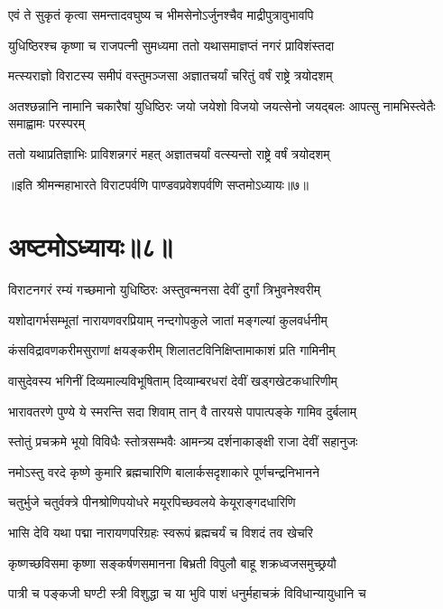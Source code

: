 \twolineshloka
{एवं ते सुकृतं कृत्वा समन्तादवघुष्य च}
{भीमसेनोऽर्जुनश्चैव माद्रीपुत्रावुभावपि}


\twolineshloka
{युधिष्ठिरश्च कृष्णा च राजपत्नी सुमध्यमा}
{ततो यथासमाज्ञप्तं नगरं प्राविशंस्तदा}


\twolineshloka
{मत्स्यराज्ञो विराटस्य समीपं वस्तुमञ्जसा}
{अज्ञातचर्यां चरितुं वर्षं राष्ट्रे त्रयोदशम्}


\threelineshloka
{अतश्छन्नानि नामानि चकारैषां युधिष्ठिरः}
{जयो जयेशो विजयो जयत्सेनो जयद्बलः}
{आपत्सु नामभिस्त्वेतैः समाह्वामः परस्परम्}


\twolineshloka
{ततो यथाप्रतिज्ञाभिः प्राविशन्नगरं महत्}
{अज्ञातचर्यां वत्स्यन्तो राष्ट्रे वर्षं त्रयोदशम्}

॥इति श्रीमन्महाभारते विराटपर्वणि पाण्डवप्रवेशपर्वणि सप्तमोऽध्यायः॥७॥

\chapter{अष्टमोऽध्यायः॥८॥}

\twolineshloka
{विराटनगरं रम्यं गच्छमानो युधिष्ठिरः}
{अस्तुवन्मनसा देवीं दुर्गां त्रिभुवनेश्वरीम्}


\twolineshloka
{यशोदागर्भसम्भूतां नारायणवरप्रियाम्}
{नन्दगोपकुले जातां मङ्गल्यां कुलवर्धनीम्}


\twolineshloka
{कंसविद्रावणकरीमसुराणां क्षयङ्करीम्}
{शिलातटविनिक्षिप्तामाकाशं प्रति गामिनीम्}


\twolineshloka
{वासुदेवस्य भगिनीं दिव्यमाल्यविभूषिताम्}
{दिव्याम्बरधरां देवीं खड्गखेटकधारिणीम्}


\twolineshloka
{भारावतरणे पुण्ये ये स्मरन्ति सदा शिवाम्}
{तान् वै तारयसे पापात्पङ्के गामिव दुर्बलाम्}


\twolineshloka
{स्तोतुं प्रचक्रमे भूयो विविधैः स्तोत्रसम्भवैः}
{आमन्त्र्य दर्शनाकाङ्क्षी राजा देवीं सहानुजः}


\twolineshloka
{नमोऽस्तु वरदे कृष्णे कुमारि ब्रह्मचारिणि}
{बालार्कसदृशाकारे पूर्णचन्द्रनिभानने}


\twolineshloka
{चतुर्भुजे चतुर्वक्त्रे पीनश्रोणिपयोधरे}
{मयूरपिच्छवलये केयूराङ्गदधारिणि}


\twolineshloka
{भासि देवि यथा पद्मा नारायणपरिग्रहः}
{स्वरूपं ब्रह्मचर्यं च विशदं तव खेचरि}


\twolineshloka
{कृष्णच्छविसमा कृष्णा सङ्कर्षणसमानना}
{बिभ्रती विपुलौ बाहू शक्रध्वजसमुच्छ्रयौ}


\twolineshloka
{पात्री च पङ्कजी घण्टी स्त्री विशुद्धा च या भुवि}
{पाशं धनुर्महाचक्रं विविधान्यायुधानि च}


